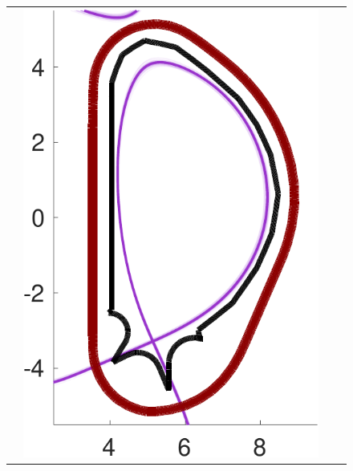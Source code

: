 \documentclass{beamer}
\begin{document}
\begin{frame}[t]
\begin{itemize}[leftmargin=5pt]
\begin{figure}[ht!]
{\begin{tabular}{cccc}
&\includegraphics[width=1\linewidth]{./figures_slides/QoI_MFMC.pdf} 
\\

\end{tabular}}
\end{figure}
\end{itemize}
\end{frame}
\end{document}
